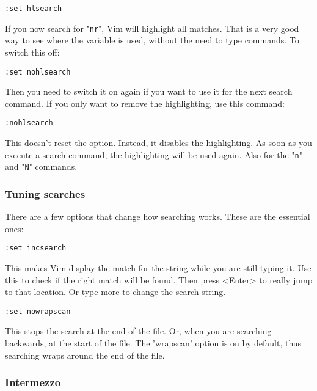  \begin{Verbatim}[samepage=true]
 :set hlsearch
 \end{Verbatim}

If you now search for "\verb!nr!", Vim will highlight all matches.
That is a very good way to see where the variable is used, without the need to type commands.
To switch this off:

 \begin{Verbatim}[samepage=true]
 :set nohlsearch
 \end{Verbatim}

Then you need to switch it on again if you want to use it for the next search
command.  If you only want to remove the highlighting, use this command:

 \begin{Verbatim}[samepage=true]
 :nohlsearch
 \end{Verbatim}

This doesn't reset the option.
Instead, it disables the highlighting.
As soon as you execute a search command, the highlighting will be used again.
Also for the "\verb!n!" and "\verb!N!" commands.

\subsubsection{Tuning searches}

There are a few options that change how searching works.  These are the
essential ones:

 \begin{Verbatim}[samepage=true]
 :set incsearch
 \end{Verbatim}

This makes Vim display the match for the string while you are still typing it.
Use this to check if the right match will be found.
Then press <Enter> to really jump to that location.
Or type more to change the search string.

 \begin{Verbatim}[samepage=true]
 :set nowrapscan
 \end{Verbatim}

This stops the search at the end of the file.
Or, when you are searching backwards, at the start of the file.
The 'wrapscan' option is on by default, thus searching wraps around the end of the file.

\subsubsection{Intermezzo}


